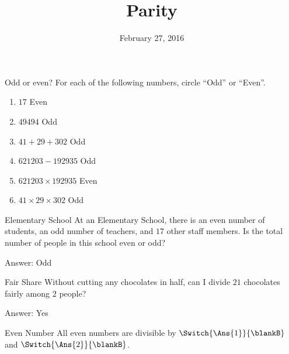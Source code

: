 \documentclass[12pt,letterpaper]{article}
\title{Parity}
\date{February 27, 2016}
\begin{document}
\maketitle

\thispagestyle{empty}

\begin{problem}{Odd or even?}
For each of the following numbers, circle ``Odd'' or ``Even''.
\begin{enumerate}
 \item $17$ \hfill {} \hspace{1em} Even
 \item $49494$ \hfill Odd \hspace{1em} 
 \item $41 + 29 + 302$ \hfill Odd \hspace{1em} 
 \item $621203 - 192935$ \hfill Odd \hspace{1em} 
 \item $621203 \times 192935$ \hfill {} \hspace{1em} Even
 \item $41 \times 29 \times 302$ \hfill Odd \hspace{1em} 
\end{enumerate}
\end{problem}

\begin{problem}{Elementary School}
 At an Elementary School, there is an even number of students, an odd number of
 teachers, and $17$ other staff members. Is the total number of people in this
 school even or odd? \par
 \hfill Answer: Odd \hspace{1em} 
\end{problem}

\begin{problem}{Fair Share}
 Without cutting any chocolates in half, can I divide $21$ chocolates fairly
 among $2$ people? \par \hfill Answer: Yes \hspace{1em} 
\end{problem}

\begin{problem}{Even Number}
 All even numbers are divisible by \(\Switch{\Ans{1}}{\blankB}\) and
 \(\Switch{\Ans{2}}{\blankB}\).
\end{problem}
\end{document}
